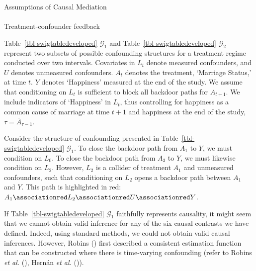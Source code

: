 \documentclass[
  single column]{article}
\makeatletter
\let\oldparagraph\paragraph
\renewcommand{\paragraph}{
    \@ifstar
      \xxxParagraphStar
      \xxxParagraphNoStar
  }
\newcommand{\xxxParagraphStar}[1]{\oldparagraph*{#1}\mbox{}}
\newcommand{\xxxParagraphNoStar}[1]{\oldparagraph{#1}\mbox{}}
\makeatother
\begin{document}
\begin{table}

\caption{\label{tbl-swigtabledeveloped}Assumptions of Causal Mediation}

\centering{

\swigtabledeveloped

}

\end{table}%

\paragraph{Treatment-confounder
feedback}\label{treatment-confounder-feedback}

Table~\ref{tbl-swigtabledeveloped} \(\mathcal{G}_1\) and
Table~\ref{tbl-swigtabledeveloped} \(\mathcal{G}_2\) represent two
subsets of possible confounding structures for a treatment regime
conducted over two intervals. Covariates in \(L_t\) denote measured
confounders, and \(U\) denotes unmeasured confounders. \(A_t\) denotes
the treatment, `Marriage Status,' at time \(t\). \(Y\) denotes
`Happiness' measured at the end of the study. We assume that
conditioning on \(L_t\) is sufficient to block all backdoor paths for
\(A_{t+1}\). We include indicators of `Happiness' in \(L_t\), thus
controlling for happiness as a common cause of marriage at time \(t+1\)
and happiness at the end of the study, \(\tau = \bar{A}_{\tau -1}\).

Consider the structure of confounding presented in
Table~\ref{tbl-swigtabledeveloped} \(\mathcal{G}_1\). To close the
backdoor path from \(A_1\) to \(Y\), we must condition on \(L_0\). To
close the backdoor path from \(A_3\) to \(Y\), we must likewise
condition on \(L_2\). However, \(L_2\) is a collider of treatment
\(A_1\) and unmeasured confounders, such that conditioning on \(L_2\)
opens a backdoor path between \(A_1\) and \(Y\). This path is
highlighted in red:
\(A_1 \associationred L_2 \associationred U \associationred Y\).

If Table~\ref{tbl-swigtabledeveloped} \(\mathcal{G}_1\) faithfully
represents causality, it might seem that we cannot obtain valid
inference for any of the six causal contrasts we have defined. Indeed,
using standard methods, we could not obtain valid causal inferences.
However, Robins () first described a
consistent estimation function that can be constructed where there is
time-varying confounding (refer to Robins \emph{et al.}
(), Hernán \emph{et al.}
()).
\end{document}

